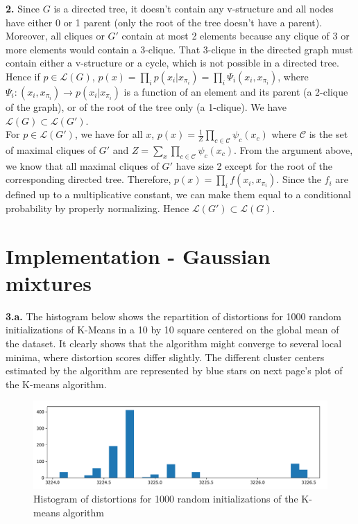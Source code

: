 \documentclass[11pt, oneside]{amsart}   	%
\begin{document}
 \textbf{2.} Since $G$ is a directed tree, it doesn't contain any v-structure and all nodes have either 0 or 1 parent (only the root of the tree doesn't have a parent). Moreover, all cliques or $G'$ contain at most 2 elements because any clique of 3 or more elements would contain a 3-clique. That 3-clique in the directed graph must contain either a v-structure or a cycle, which is not possible in a directed tree. 
 \\
 
 Hence if $p\in \mathcal{L}(G)$, $p(x) = \prod_i p(x_i | x_{\pi_i}) = \prod_i \Psi_i(x_i, x_{\pi_i})$, where $\Psi_i: (x_i, x_{\pi_i})\rightarrow p(x_i|x_{\pi_i})$ is a function of an element and its parent (a 2-clique of the graph), or of the root of the tree only (a 1-clique). We have $\boxed{\mathcal{L}(G) \subset \mathcal{L}(G')}$.
 \\
 
 For $p\in \mathcal{L}(G')$, we have for all $x$, $p(x) = \frac{1}{Z} \prod_{c\in\mathcal{C}} \psi_c(x_c)$ where $\mathcal{C}$ is the set of maximal cliques of $G'$ and $Z = \sum_x  \prod_{c\in\mathcal{C}} \psi_c(x_c)$. From the argument above, we know that all maximal cliques of $G'$ have size 2 except for the root of the corresponding directed tree. Therefore, $p(x) = \prod_i f(x_i, x_{\pi_i})$. Since the $f_i$ are defined up to a multiplicative constant, we can make them equal to a conditional probability by properly normalizing. Hence  $\boxed{\mathcal{L}(G') \subset \mathcal{L}(G)}$.

 \vfill
 
 \clearpage
\section{Implementation - Gaussian mixtures}
 \vfill
 \textbf{3.a.} The histogram below shows the repartition of distortions for 1000 random initializations of K-Means in a 10 by 10 square centered on the global mean of the dataset. It clearly shows that the algorithm might converge to several local minima, where distortion scores differ slightly. The different cluster centers estimated by the algorithm are represented by blue stars on next page's plot of the K-means algorithm.
\begin{figure}[h!]
\centering
 \includegraphics[width=0.7\linewidth]{Distortions.pdf}
 \caption{Histogram of distortions for 1000 random initializations of the K-means algorithm}
\end{figure}
\vfill
\end{document}
